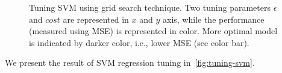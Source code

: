	\begin{figure}[H]
		\begin{adjustwidth}{-3cm}{}
		\centering
		\end{adjustwidth}
		\caption{Tuning \ac{SVM} using grid search technique. Two tuning parameters $\epsilon$ and $cost$ are represented in $x$ and $y$ axis, while the performance (measured using \ac{MSE}) is represented in color. More optimal model is indicated by darker color, i.e., lower \ac{MSE} (see color bar).}
		\label{fig:tuning-svm}
	\end{figure}

	We present the result of \ac{SVM} regression tuning in~\autoref{fig:tuning-svm}.

